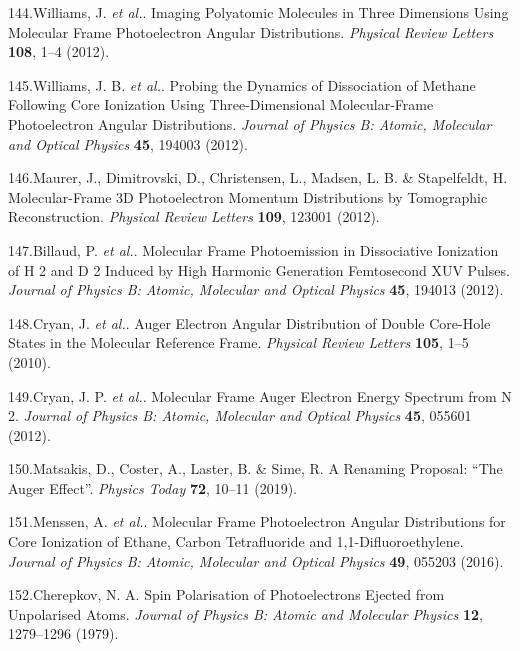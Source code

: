 \documentclass[10pt]{article}
\begin{document}
\label{csl:144}144.Williams, J. \textit{et al.}. {Imaging {{Polyatomic Molecules}} in {{Three Dimensions Using Molecular Frame Photoelectron Angular Distributions}}}. \textit{Physical Review Letters} \textbf{108}, 1–4 (2012).

\label{csl:145}145.Williams, J. B. \textit{et al.}. {Probing the Dynamics of Dissociation of Methane Following Core Ionization Using Three-Dimensional Molecular-Frame Photoelectron Angular Distributions}. \textit{Journal of Physics B: Atomic, Molecular and Optical Physics} \textbf{45}, 194003 (2012).

\label{csl:146}146.Maurer, J., Dimitrovski, D., Christensen, L., Madsen, L. B. \& Stapelfeldt, H. {Molecular-{{Frame 3D Photoelectron Momentum Distributions}} by {{Tomographic Reconstruction}}}. \textit{Physical Review Letters} \textbf{109}, 123001 (2012).

\label{csl:147}147.Billaud, P. \textit{et al.}. {Molecular Frame Photoemission in Dissociative Ionization of {{H}} 2 and {{D}} 2 Induced by High Harmonic Generation Femtosecond {{XUV}} Pulses}. \textit{Journal of Physics B: Atomic, Molecular and Optical Physics} \textbf{45}, 194013 (2012).

\label{csl:148}148.Cryan, J. \textit{et al.}. {Auger {{Electron Angular Distribution}} of {{Double Core-Hole States}} in the {{Molecular Reference Frame}}}. \textit{Physical Review Letters} \textbf{105}, 1–5 (2010).

\label{csl:149}149.Cryan, J. P. \textit{et al.}. {Molecular Frame {{Auger}} Electron Energy Spectrum from {{N}} 2}. \textit{Journal of Physics B: Atomic, Molecular and Optical Physics} \textbf{45}, 055601 (2012).

\label{csl:150}150.Matsakis, D., Coster, A., Laster, B. \& Sime, R. {A Renaming Proposal: ``{{The Auger}} Effect''}. \textit{Physics Today} \textbf{72}, 10–11 (2019).

\label{csl:151}151.Menssen, A. \textit{et al.}. {Molecular Frame Photoelectron Angular Distributions for Core Ionization of Ethane, Carbon Tetrafluoride and 1,1-Difluoroethylene}. \textit{Journal of Physics B: Atomic, Molecular and Optical Physics} \textbf{49}, 055203 (2016).

\label{csl:152}152.Cherepkov, N. A. {Spin Polarisation of Photoelectrons Ejected from Unpolarised Atoms}. \textit{Journal of Physics B: Atomic and Molecular Physics} \textbf{12}, 1279–1296 (1979).
\end{document}
